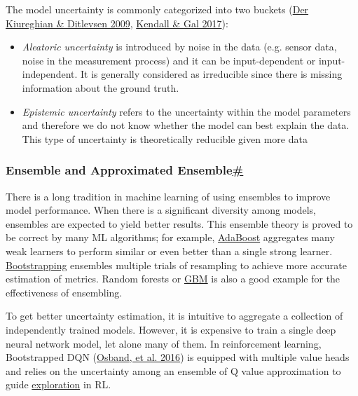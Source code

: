 The model uncertainty is commonly categorized into two buckets (\href{https://citeseerx.ist.psu.edu/viewdoc/download?doi=10.1.1.455.9057&rep=rep1&type=pdf}{Der Kiureghian \& Ditlevsen 2009}, \href{https://arxiv.org/abs/1703.04977}{Kendall \& Gal 2017}):

\begin{itemize}
\tightlist
\item
  \emph{Aleatoric uncertainty} is introduced by noise in the data (e.g. sensor data, noise in the measurement process) and it can be input-dependent or input-independent. It is generally considered as irreducible since there is missing information about the ground truth.
\item
  \emph{Epistemic uncertainty} refers to the uncertainty within the model parameters and therefore we do not know whether the model can best explain the data. This type of uncertainty is theoretically reducible given more data
\end{itemize}

\subsubsection{\texorpdfstring{Ensemble and Approximated Ensemble\hyperref[ensemble-and-approximated-ensemble]{\#}}{Ensemble and Approximated Ensemble\#}}\label{ensemble-and-approximated-ensemble}

There is a long tradition in machine learning of using ensembles to improve model performance. When there is a significant diversity among models, ensembles are expected to yield better results. This ensemble theory is proved to be correct by many ML algorithms; for example, \href{https://en.wikipedia.org/wiki/AdaBoost}{AdaBoost} aggregates many weak learners to perform similar or even better than a single strong learner. \href{https://en.wikipedia.org/wiki/Bootstrapping_(statistics)}{Bootstrapping} ensembles multiple trials of resampling to achieve more accurate estimation of metrics. Random forests or \href{https://en.wikipedia.org/wiki/Gradient_boosting}{GBM} is also a good example for the effectiveness of ensembling.

To get better uncertainty estimation, it is intuitive to aggregate a collection of independently trained models. However, it is expensive to train a single deep neural network model, let alone many of them. In reinforcement learning, Bootstrapped DQN (\href{https://arxiv.org/abs/1602.04621}{Osband, et al. 2016}) is equipped with multiple value heads and relies on the uncertainty among an ensemble of Q value approximation to guide \href{https://lilianweng.github.io/posts/2020-06-07-exploration-drl/\#q-value-exploration}{exploration} in RL.

